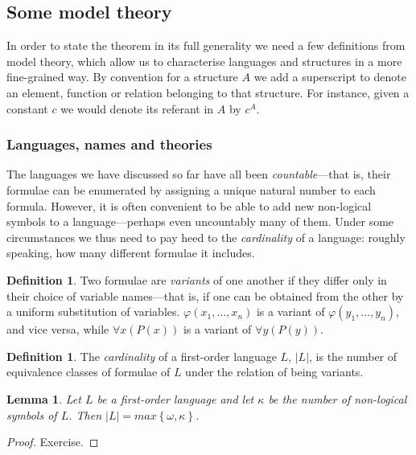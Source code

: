 \documentclass[10pt, a4paper, oneside]{article}
\theoremstyle{definition}
\newtheorem{dfn}[thm]{Definition}
\theoremstyle{remark}
\theoremstyle{plain}
\newtheorem{lem}[thm]{Lemma}
\theoremstyle{plain}
\begin{document}
\subsection{Some model theory}

In order to state the theorem in its full generality we need a few definitions
from model theory, which allow us to characterise languages and structures in a
more fine-grained way. By convention for a structure $A$ we add a superscript to
denote an element, function or relation belonging to that structure. For
instance, given a constant $c$ we would denote its referant in $A$ by $c^A$.

\subsubsection{Languages, names and theories}

The languages we have discussed so far have all been \emph{countable}---that is,
their formulae can be enumerated by assigning a unique natural number to each
formula. However, it is often convenient to be able to add new non-logical
symbols to a language---perhaps even uncountably many of them. Under some
circumstances we thus need to pay heed to the \emph{cardinality} of a language:
roughly speaking, how many different formulae it includes.

\begin{dfn}
    Two formulae are \emph{variants} of one another if they differ only in their
    choice of variable names---that is, if one can be obtained from the other by
    a uniform substitution of variables. $\varphi(x_1, \dotsc, x_n)$ is a
    variant of $\varphi(y_1, \dotsc, y_n)$, and vice versa, while
    $\forall{x} (P(x))$ is a variant of $\forall{y} (P(y))$.
\end{dfn}

\begin{dfn}
    The \emph{cardinality} of a first-order language $L$, $|L|$, is the number
    of equivalence classes of formulae of $L$ under the relation of being
    variants.
\end{dfn}

\begin{lem}
    Let $L$ be a first-order language and let $\kappa$ be the number of
    non-logical symbols of $L$. Then $|L| = max \left\{ \omega, \kappa \right\}$.
\end{lem}

\begin{proof}
    Exercise.
\end{proof}
\end{document}
